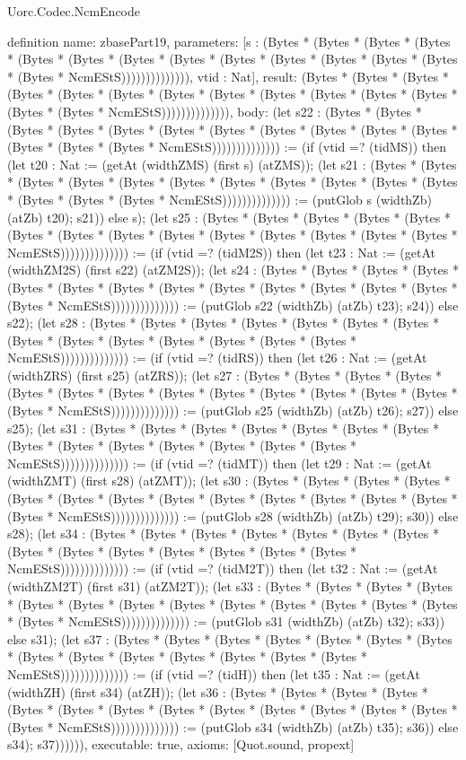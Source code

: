 \begin{lexlean}{Uorc.Codec.NcmEncode}
\begin{semanticmodule}
definition{
  name: zbasePart19,
  parameters: [s : (Bytes * (Bytes * (Bytes * (Bytes * (Bytes * (Bytes * (Bytes * (Bytes * (Bytes * (Bytes * (Bytes * (Bytes * (Bytes * (Bytes * NcmEStS)))))))))))))), vtid : Nat],
  result: (Bytes * (Bytes * (Bytes * (Bytes * (Bytes * (Bytes * (Bytes * (Bytes * (Bytes * (Bytes * (Bytes * (Bytes * (Bytes * (Bytes * NcmEStS)))))))))))))),
  body: (let s22 : (Bytes * (Bytes * (Bytes * (Bytes * (Bytes * (Bytes * (Bytes * (Bytes * (Bytes * (Bytes * (Bytes * (Bytes * (Bytes * (Bytes * NcmEStS)))))))))))))) := (if (vtid =? (tidMS)) then (let t20 : Nat := (getAt (widthZMS) (first s) (atZMS)); (let s21 : (Bytes * (Bytes * (Bytes * (Bytes * (Bytes * (Bytes * (Bytes * (Bytes * (Bytes * (Bytes * (Bytes * (Bytes * (Bytes * (Bytes * NcmEStS)))))))))))))) := (putGlob s (widthZb) (atZb) t20); s21)) else s); (let s25 : (Bytes * (Bytes * (Bytes * (Bytes * (Bytes * (Bytes * (Bytes * (Bytes * (Bytes * (Bytes * (Bytes * (Bytes * (Bytes * (Bytes * NcmEStS)))))))))))))) := (if (vtid =? (tidM2S)) then (let t23 : Nat := (getAt (widthZM2S) (first s22) (atZM2S)); (let s24 : (Bytes * (Bytes * (Bytes * (Bytes * (Bytes * (Bytes * (Bytes * (Bytes * (Bytes * (Bytes * (Bytes * (Bytes * (Bytes * (Bytes * NcmEStS)))))))))))))) := (putGlob s22 (widthZb) (atZb) t23); s24)) else s22); (let s28 : (Bytes * (Bytes * (Bytes * (Bytes * (Bytes * (Bytes * (Bytes * (Bytes * (Bytes * (Bytes * (Bytes * (Bytes * (Bytes * (Bytes * NcmEStS)))))))))))))) := (if (vtid =? (tidRS)) then (let t26 : Nat := (getAt (widthZRS) (first s25) (atZRS)); (let s27 : (Bytes * (Bytes * (Bytes * (Bytes * (Bytes * (Bytes * (Bytes * (Bytes * (Bytes * (Bytes * (Bytes * (Bytes * (Bytes * (Bytes * NcmEStS)))))))))))))) := (putGlob s25 (widthZb) (atZb) t26); s27)) else s25); (let s31 : (Bytes * (Bytes * (Bytes * (Bytes * (Bytes * (Bytes * (Bytes * (Bytes * (Bytes * (Bytes * (Bytes * (Bytes * (Bytes * (Bytes * NcmEStS)))))))))))))) := (if (vtid =? (tidMT)) then (let t29 : Nat := (getAt (widthZMT) (first s28) (atZMT)); (let s30 : (Bytes * (Bytes * (Bytes * (Bytes * (Bytes * (Bytes * (Bytes * (Bytes * (Bytes * (Bytes * (Bytes * (Bytes * (Bytes * (Bytes * NcmEStS)))))))))))))) := (putGlob s28 (widthZb) (atZb) t29); s30)) else s28); (let s34 : (Bytes * (Bytes * (Bytes * (Bytes * (Bytes * (Bytes * (Bytes * (Bytes * (Bytes * (Bytes * (Bytes * (Bytes * (Bytes * (Bytes * NcmEStS)))))))))))))) := (if (vtid =? (tidM2T)) then (let t32 : Nat := (getAt (widthZM2T) (first s31) (atZM2T)); (let s33 : (Bytes * (Bytes * (Bytes * (Bytes * (Bytes * (Bytes * (Bytes * (Bytes * (Bytes * (Bytes * (Bytes * (Bytes * (Bytes * (Bytes * NcmEStS)))))))))))))) := (putGlob s31 (widthZb) (atZb) t32); s33)) else s31); (let s37 : (Bytes * (Bytes * (Bytes * (Bytes * (Bytes * (Bytes * (Bytes * (Bytes * (Bytes * (Bytes * (Bytes * (Bytes * (Bytes * (Bytes * NcmEStS)))))))))))))) := (if (vtid =? (tidH)) then (let t35 : Nat := (getAt (widthZH) (first s34) (atZH)); (let s36 : (Bytes * (Bytes * (Bytes * (Bytes * (Bytes * (Bytes * (Bytes * (Bytes * (Bytes * (Bytes * (Bytes * (Bytes * (Bytes * (Bytes * NcmEStS)))))))))))))) := (putGlob s34 (widthZb) (atZb) t35); s36)) else s34); s37)))))),
  executable: true,
  axioms: [Quot.sound, propext]
}


\end{semanticmodule}
\end{lexlean}
